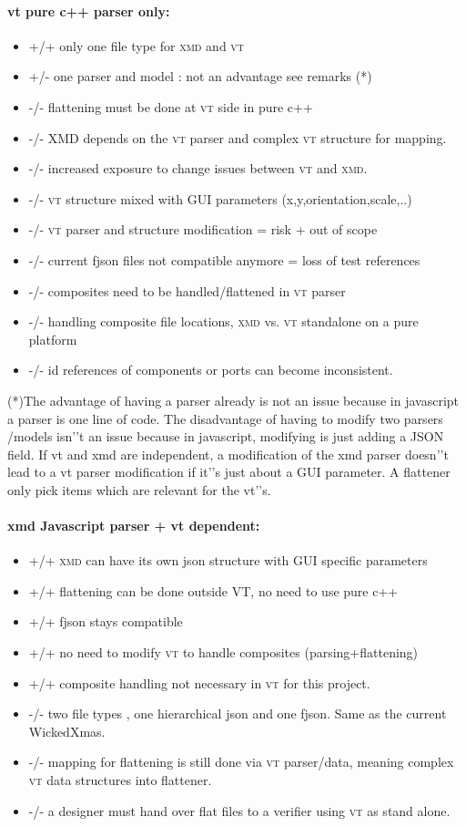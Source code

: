 \documentclass[a4paper,11pt,final]{article}
\newcommand{\xmd}{\textsc{xmd}\xspace}%
\newcommand{\vt}{\textsc{vt}\xspace}%
\begin{document}
\paragraph{vt pure c++ parser only:}
\begin{itemize}
\item +/+ only one file type for \xmd and \vt
\item +/- one parser and model : not an advantage see remarks (*)
\item -/- flattening must be done at \vt side in pure c++
\item -/- XMD depends on the \vt parser and complex \vt structure for mapping.
\item -/- increased exposure to change issues between \vt and \xmd.
\item -/- \vt structure mixed with GUI parameters (x,y,orientation,scale,..)
\item -/- \vt parser and structure modification = risk + out of scope
\item -/- current fjson files not compatible anymore = loss of test references
\item -/- composites need to be handled/flattened in \vt parser
\item -/- handling composite file locations, \xmd vs. \vt standalone on a pure platform
\item -/- id references of components or ports can become inconsistent.
\end{itemize}

(*)The advantage of having a parser already is not an issue because in
javascript a parser is one line of code.
The disadvantage of having to modify two parsers /models isn'’t an issue
because in javascript, modifying is just adding a JSON field.
If vt and xmd are independent, a modification of the xmd parser doesn'’t lead to
a vt parser modification if it'’s just about a GUI parameter. A flattener only pick
items which are relevant for the vt'’s.

\paragraph{xmd Javascript parser + vt dependent:}
\begin{itemize}
\item +/+ \xmd can have its own json structure with GUI specific parameters
\item +/+ flattening can be done outside VT, no need to use pure c++
\item +/+ fjson stays compatible
\item +/+ no need to modify \vt to handle composites (parsing+flattening)
\item +/+ composite handling not necessary in \vt for this project.
\item -/- two file types , one hierarchical json and one fjson. Same as the current WickedXmas.
\item -/- mapping for flattening is still done via \vt parser/data, meaning complex \vt data structures into flattener.
\item -/- a designer must hand over flat files to a verifier using \vt as stand alone. 
\end{itemize}
\end{document}

